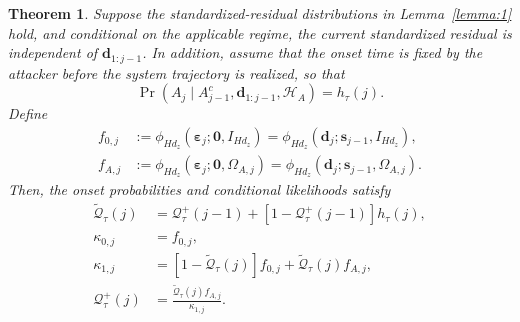 \documentclass[letterpaper, 10 pt, conference]{ieeeconf}
\theoremstyle{plain}
\newtheorem{theorem}{Theorem}
\begin{document}
\begin{theorem}\label{theorem:mcusum_belief}
    Suppose the standardized-residual distributions in Lemma~\ref{lemma:1} hold, and conditional on the applicable regime, the current standardized residual is independent of $\mathbf{d}_{1:j-1}$. In addition, assume that the onset time is fixed by the attacker before the system trajectory is realized, so that
    \begin{equation} \label{eq:onset_independence}
    \Pr\left(A_j \mid A_{j-1}^{c}, \mathbf{d}_{1:j-1}, \mathcal{H}_A\right) = h_\tau(j).
    \end{equation}
    Define
    \begin{align*}
    f_{0,j} &:= \phi_{Hd_z}\!\left(\pmb{\varepsilon}_j; \mathbf{0},I_{Hd_z} \right) = \phi_{Hd_z}\left( \mathbf{d}_j; \mathbf{s}_{j-1},I_{Hd_z} \right), \\
    f_{A,j} &:= \phi_{Hd_z}\left(\pmb{\varepsilon}_j; \mathbf{0},\Omega_{A,j}\right) = \phi_{Hd_z} \left(\mathbf{d}_j;\mathbf{s}_{j-1},\Omega_{A,j}\right).
    \end{align*}
    Then, the onset probabilities and conditional likelihoods satisfy
    \begin{align}
    \widetilde{\mathcal{Q}}_\tau(j) &= \mathcal{Q}_\tau^{+}(j-1) + \left[1-\mathcal{Q}_\tau^{+}(j-1)\right]h_\tau(j), \label{eq:onset_prior_update}\\
    \kappa_{0,j} &= f_{0,j}, \label{eq:nominal_likelihood}\\
    \kappa_{1,j} &= \left[1-\widetilde{\mathcal{Q}}_\tau(j) \right]f_{0,j} + \widetilde{\mathcal{Q}}_\tau(j) f_{A,j}, \label{eq:attack_likelihood}\\
    \mathcal{Q}_\tau^{+}(j) &= \frac{\widetilde{\mathcal{Q}}_\tau(j) f_{A,j}}{\kappa_{1,j}}. \label{eq:onset_posterior_update}
    \end{align}
\end{theorem}
\end{document}
